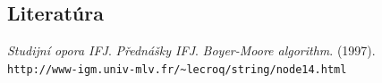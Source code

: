 \documentclass[12pt,a4paper,titlepage,final]{article}
\begin{document}
\subsection{Literatúra}
\begin{thebibliography}{Per00}
    \emph{Studijní opora IFJ}.
    \emph{Přednášky IFJ}.
    \emph{Boyer-Moore algorithm}. (1997).\\
    \verb|http://www-igm.univ-mlv.fr/~lecroq/string/node14.html|
\end{thebibliography}
\end{document}
